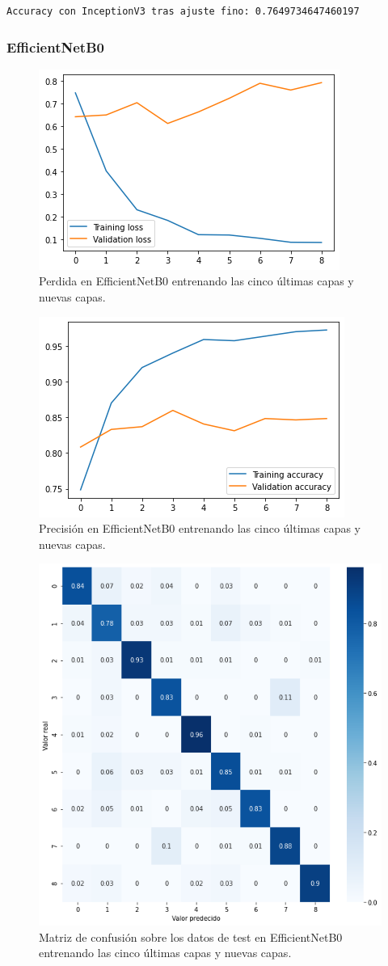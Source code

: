 \begin{lstlisting}
Accuracy con InceptionV3 tras ajuste fino: 0.7649734647460197
\end{lstlisting}



\subsubsection{EfficientNetB0}


\begin{figure}[H]
  \centering
  \includegraphics[width=0.5\linewidth]{Imagenes/entrenamiento_redes/5-ult/efficientnet_5ult_loss.png}
  \caption{Perdida en EfficientNetB0 entrenando las cinco últimas capas y nuevas capas.}
\end{figure}

\begin{figure}[H]
  \centering
  \includegraphics[width=0.5\linewidth]{Imagenes/entrenamiento_redes/5-ult/efficientnet_5ult_acc.png}
  \caption{Precisión en EfficientNetB0 entrenando las cinco últimas capas y nuevas capas.}
\end{figure}

\begin{figure}[H]
  \centering
  \includegraphics[width=0.5\linewidth]{Imagenes/entrenamiento_redes/5-ult/efficientnet_5ult_matriz.png}
  \caption{Matriz de confusión sobre los datos de test en EfficientNetB0 entrenando las cinco últimas capas y nuevas capas.}
\end{figure}


